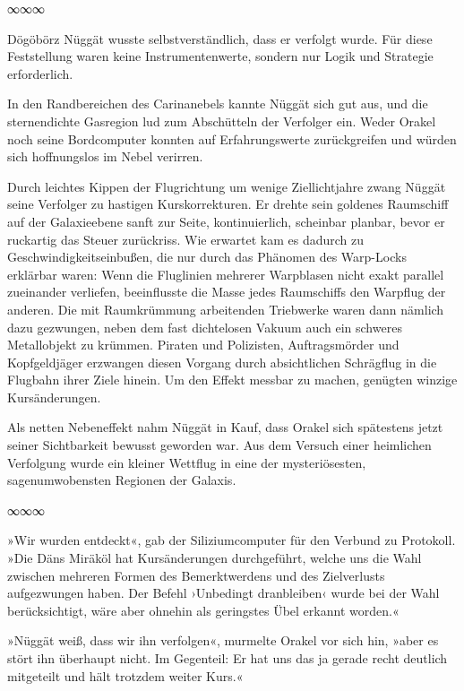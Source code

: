 \begin{center}
	∞∞∞
\end{center}

Dögöbörz Nüggät wusste selbstverständlich, dass er verfolgt wurde. Für diese Feststellung waren keine Instrumentenwerte, sondern nur Logik und Strategie erforderlich.

In den Randbereichen des Carinanebels kannte Nüggät sich gut aus, und die sternendichte Gasregion lud zum Abschütteln der Verfolger ein. Weder Orakel noch seine Bordcomputer konnten auf Erfahrungswerte zurückgreifen und würden sich hoffnungslos im Nebel verirren.

Durch leichtes Kippen der Flugrichtung um wenige Ziellichtjahre zwang Nüggät seine Verfolger zu hastigen Kurskorrekturen. Er drehte sein goldenes Raumschiff auf der Galaxieebene sanft zur Seite, kontinuierlich, scheinbar planbar, bevor er ruckartig das Steuer zurückriss. Wie erwartet kam es dadurch zu Geschwindigkeitseinbußen, die nur durch das Phänomen des Warp-Locks erklärbar waren: Wenn die Fluglinien mehrerer Warpblasen nicht exakt parallel zueinander verliefen, beeinflusste die Masse jedes Raumschiffs den Warpflug der anderen. Die mit Raumkrümmung arbeitenden Triebwerke waren dann nämlich dazu gezwungen, neben dem fast dichtelosen Vakuum auch ein schweres Metallobjekt zu krümmen. Piraten und Polizisten, Auftragsmörder und Kopfgeldjäger erzwangen diesen Vorgang durch absichtlichen Schrägflug in die Flugbahn ihrer Ziele hinein.  Um den Effekt messbar zu machen, genügten winzige Kursänderungen.

Als netten Nebeneffekt nahm Nüggät in Kauf, dass Orakel sich spätestens jetzt seiner Sichtbarkeit bewusst geworden war. Aus dem Versuch einer heimlichen Verfolgung wurde ein kleiner Wettflug in eine der mysteriösesten, sagenumwobensten Regionen der Galaxis.

\begin{center}
	∞∞∞
\end{center}

»Wir wurden entdeckt«, gab der Siliziumcomputer für den Verbund zu Protokoll. »Die Däns Miräköl hat Kursänderungen durchgeführt, welche uns die Wahl zwischen mehreren Formen des Bemerktwerdens und des Zielverlusts aufgezwungen haben. Der Befehl ›Unbedingt dranbleiben‹ wurde bei der Wahl berücksichtigt, wäre aber ohnehin als geringstes Übel erkannt worden.«

»Nüggät weiß, dass wir ihn verfolgen«, murmelte Orakel vor sich hin, »aber es stört ihn überhaupt nicht. Im Gegenteil: Er hat uns das ja gerade recht deutlich mitgeteilt und hält trotzdem weiter Kurs.«

